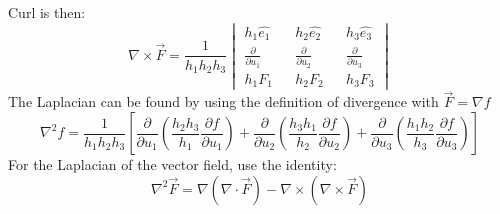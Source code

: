 \documentclass[11pt]{article}
\begin{document}
                    Curl is then:
                    \begin{equation}
                        \label{eq:equation15}
                        \nabla \times \vec{F} = \frac{1}{h_1 h_2 h_3}
                        \begin{vmatrix}
                            h_1 \hat{e_1} && h_2 \hat{e_2} && h_3 \hat{e_3} \\
                            \frac{\partial}{\partial u_1} &&  \frac{\partial}{\partial u_2} &&  \frac{\partial}{\partial u_3}\\
                            h_1 F_1 && h_2 F_2 && h_3 F_3
                        \end{vmatrix}
                    \end{equation}
                    The Laplacian can be found by using the definition of divergence with $\vec{F} = \nabla f$
                    \begin{equation}
                        \label{eq:equation16}
                        \nabla^2 f = \frac{1}{h_1 h_2 h_3} \left[ \frac{\partial}{\partial u_1} \left( \frac{h_2 h_3}{h_1}
                        \frac{\partial f}{\partial u_1}\right)
                        + \frac{\partial}{\partial u_2} \left( \frac{h_3 h_1}{h_2}
                        \frac{\partial f}{\partial u_2}\right)
                        +\frac{\partial}{\partial u_3} \left( \frac{h_1 h_2}{h_3}
                        \frac{\partial f}{\partial u_3}\right)
                        \right]
                    \end{equation}
                    For the Laplacian of the vector field, use the identity:
                    \begin{equation}
                        \label{eq:equation17}
                        \nabla^2 \vec{F} = \nabla ( \nabla \cdot \vec{F}) - \nabla \times (\nabla \times \vec{F})
                    \end{equation}
\end{document}
